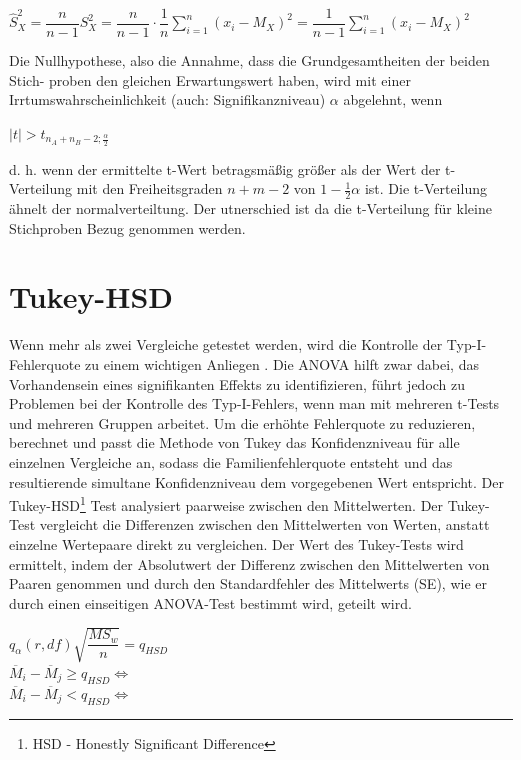\begin{center}
  $\hat{S}_X^2 = \dfrac{n}{n-1} S_X^2 = \dfrac{n}{n-1} \cdot \dfrac{1}{n} \sum_{i=1}^n (x_i - M_X)^2 = \dfrac{1}{n-1} \sum_{i=1}^n (x_i - M_X)^2$
\end{center}

Die Nullhypothese, also die Annahme, dass die Grundgesamtheiten der beiden Stich-
proben den gleichen Erwartungswert haben, wird mit einer Irrtumswahrscheinlichkeit
(auch: Signifikanzniveau) $\alpha$ abgelehnt, wenn

\begin{center}
  $|t| > t_{n_A + n_B - 2; \frac{\alpha}{2}}$
\end{center}

d. h. wenn der ermittelte t-Wert betragsmäßig größer als der Wert der t-Verteilung
mit den Freiheitsgraden $n + m - 2$ von $1 - \frac{1}{2}\alpha$ ist.
Die t-Verteilung ähnelt der normalverteiltung. Der utnerschied ist da die t-Verteilung für kleine Stichproben Bezug genommen werden.



\section{Tukey-HSD}
Wenn mehr als zwei Vergleiche getestet werden, wird die Kontrolle der Typ-I-Fehlerquote zu einem wichtigen Anliegen \cite{tukey_HSD} \cite{tukey_hsd_book}. 
Die ANOVA hilft zwar dabei, das Vorhandensein eines signifikanten Effekts zu identifizieren, 
führt jedoch zu Problemen bei der Kontrolle des Typ-I-Fehlers, wenn man mit mehreren t-Tests und mehreren Gruppen arbeitet.
Um die erhöhte Fehlerquote zu reduzieren, berechnet und passt die Methode von Tukey das Konfidenzniveau für alle einzelnen Vergleiche an, 
sodass die Familienfehlerquote entsteht und das resultierende simultane Konfidenzniveau dem vorgegebenen Wert entspricht.
Der Tukey-HSD\footnote{HSD - Honestly Significant Difference} Test analysiert paarweise
zwischen den Mittelwerten.
Der Tukey-Test vergleicht die Differenzen zwischen den Mittelwerten von Werten, anstatt einzelne Wertepaare direkt zu vergleichen. 
Der Wert des Tukey-Tests wird ermittelt, indem der Absolutwert der Differenz zwischen den Mittelwerten von Paaren genommen und 
durch den Standardfehler des Mittelwerts (SE), wie er durch einen einseitigen ANOVA-Test bestimmt wird, geteilt wird.

\begin{center}
  $q_{\alpha}(r, df){\sqrt{\dfrac{MS_w}{n}}} = q_{HSD}$ \\
  $\overline{M}_i - \overline{M}_j \geq q_{HSD} \iff$  \\
  $\overline{M}_i - \overline{M}_j < q_{HSD} \iff$  
\end{center}

